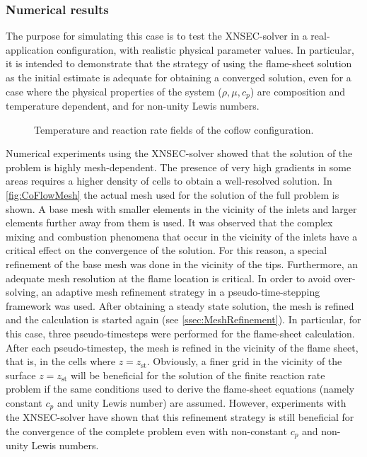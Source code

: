 \subsubsection{Numerical results}
The purpose for simulating this case is to test the XNSEC-solver in a real-application configuration, with realistic physical parameter values. In particular, it is intended to demonstrate that the strategy of using the flame-sheet solution as the initial estimate is adequate for obtaining a converged solution, even for a case where the physical properties of the system ($\rho, \mu, c_p$) are composition and temperature dependent, and for non-unity Lewis numbers. 
\begin{figure}[t!]
	\centering
	\pgfplotsset{width=0.6\textwidth, compat=1.3}
	\hspace{-2.4cm} 	
	\caption{Temperature and reaction rate fields of the coflow configuration.} \label{fig:CoFlowFlameFig}
\end{figure}
Numerical experiments using the XNSEC-solver showed that the solution of the problem is highly mesh-dependent. The presence of very high gradients in some areas requires a higher density of cells to obtain a well-resolved solution.  In \cref{fig:CoFlowMesh} the actual mesh used for the solution of the full problem is shown.  A base mesh with smaller elements in the vicinity of the inlets and larger elements further away from them is used. It was observed that the complex mixing and combustion phenomena that occur in the vicinity of the inlets have a critical effect on the convergence of the solution. For this reason, a special refinement of the base mesh was done in the vicinity of the tips. Furthermore, an adequate mesh resolution  at the flame location is critical. In order to avoid over-solving, an adaptive mesh refinement strategy in a pseudo-time-stepping framework was used. After obtaining a steady state solution, the mesh is refined and the calculation is started again (see \cref{ssec:MeshRefinement}). In particular, for this case, three pseudo-timesteps were performed for the flame-sheet calculation. After each pseudo-timestep, the mesh is refined in the vicinity of the flame sheet, that is, in the cells where $z = z_{\text{st}}$. 
Obviously, a finer grid in the vicinity of the surface $z = z_{\text{st}}$ will be beneficial for the solution of the finite reaction rate problem if the same conditions used to derive the flame-sheet equations (namely constant $c_p$ and unity Lewis number) are assumed.  
However, experiments with the XNSEC-solver have shown that this refinement strategy is still beneficial for the convergence of the complete problem even with non-constant $c_p$ and non-unity Lewis numbers.

